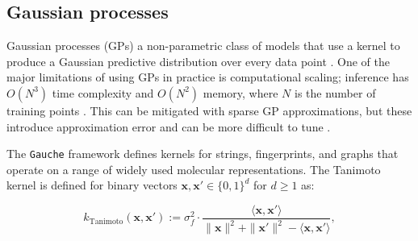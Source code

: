 \subsection{Gaussian processes}

Gaussian processes (GPs) a non-parametric class of models that use a kernel to produce a Gaussian predictive distribution over every data point \citep{Obrezanova2007, Rasmussen2005}. One of the major limitations of using GPs in practice is computational scaling; inference has $O(N^3)$ time complexity and $O(N^2)$ memory, where $N$ is the number of training points \citep{Rasmussen2005}. This can be mitigated with sparse GP approximations, but these introduce approximation error and can be more difficult to tune \citep{quinonero2005}.


The \texttt{Gauche} framework \citep{gauche} defines kernels for strings, fingerprints, and graphs that operate on a range of widely used molecular representations. The Tanimoto kernel \citep{Ralaivola2005, moss2020} is defined for binary vectors $\mathbf{x}, \mathbf{x}' \in \{0, 1\}^d$ for $d \geq 1$ as:

$$
k_{\text{Tanimoto}}(\mathbf{x}, \mathbf{x}') := \sigma_f^2 \cdot \frac{\langle \mathbf{x}, \mathbf{x}' \rangle}{\|\mathbf{x}\|^2 + \|\mathbf{x}'\|^2 - \langle \mathbf{x}, \mathbf{x}' \rangle},
$$

